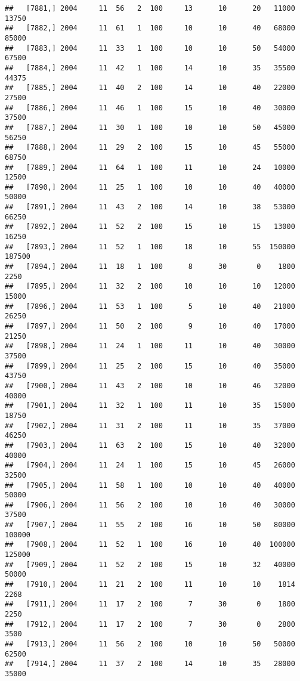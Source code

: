 \documentclass{article}\usepackage[]{graphicx}\usepackage[]{color}
\makeatletter
\newenvironment{kframe}{%
 \def\at@end@of@kframe{}%
 \ifinner\ifhmode%
  \def\at@end@of@kframe{\end{minipage}}%
  \begin{minipage}{\columnwidth}%
 \fi\fi%
 \def\FrameCommand##1{\hskip\@totalleftmargin \hskip-\fboxsep
 \colorbox{shadecolor}{##1}\hskip-\fboxsep
     \hskip-\linewidth \hskip-\@totalleftmargin \hskip\columnwidth}%
 \MakeFramed {\advance\hsize-\width
   \@totalleftmargin\z@ \linewidth\hsize
   \@setminipage}}%
 {\par\unskip\endMakeFramed%
 \at@end@of@kframe}
\newenvironment{knitrout}{}{} %
\makeatother
\begin{document}
\begin{knitrout}
\begin{kframe}
\begin{verbatim}
##   [7881,] 2004     11  56   2  100     13      10      20   11000   13750
##   [7882,] 2004     11  61   1  100     10      10      40   68000   85000
##   [7883,] 2004     11  33   1  100     10      10      50   54000   67500
##   [7884,] 2004     11  42   1  100     14      10      35   35500   44375
##   [7885,] 2004     11  40   2  100     14      10      40   22000   27500
##   [7886,] 2004     11  46   1  100     15      10      40   30000   37500
##   [7887,] 2004     11  30   1  100     10      10      50   45000   56250
##   [7888,] 2004     11  29   2  100     15      10      45   55000   68750
##   [7889,] 2004     11  64   1  100     11      10      24   10000   12500
##   [7890,] 2004     11  25   1  100     10      10      40   40000   50000
##   [7891,] 2004     11  43   2  100     14      10      38   53000   66250
##   [7892,] 2004     11  52   2  100     15      10      15   13000   16250
##   [7893,] 2004     11  52   1  100     18      10      55  150000  187500
##   [7894,] 2004     11  18   1  100      8      30       0    1800    2250
##   [7895,] 2004     11  32   2  100     10      10      10   12000   15000
##   [7896,] 2004     11  53   1  100      5      10      40   21000   26250
##   [7897,] 2004     11  50   2  100      9      10      40   17000   21250
##   [7898,] 2004     11  24   1  100     11      10      40   30000   37500
##   [7899,] 2004     11  25   2  100     15      10      40   35000   43750
##   [7900,] 2004     11  43   2  100     10      10      46   32000   40000
##   [7901,] 2004     11  32   1  100     11      10      35   15000   18750
##   [7902,] 2004     11  31   2  100     11      10      35   37000   46250
##   [7903,] 2004     11  63   2  100     15      10      40   32000   40000
##   [7904,] 2004     11  24   1  100     15      10      45   26000   32500
##   [7905,] 2004     11  58   1  100     10      10      40   40000   50000
##   [7906,] 2004     11  56   2  100     10      10      40   30000   37500
##   [7907,] 2004     11  55   2  100     16      10      50   80000  100000
##   [7908,] 2004     11  52   1  100     16      10      40  100000  125000
##   [7909,] 2004     11  52   2  100     15      10      32   40000   50000
##   [7910,] 2004     11  21   2  100     11      10      10    1814    2268
##   [7911,] 2004     11  17   2  100      7      30       0    1800    2250
##   [7912,] 2004     11  17   2  100      7      30       0    2800    3500
##   [7913,] 2004     11  56   2  100     10      10      50   50000   62500
##   [7914,] 2004     11  37   2  100     14      10      35   28000   35000

\end{verbatim}
\end{kframe}
\end{knitrout}
\end{document}
